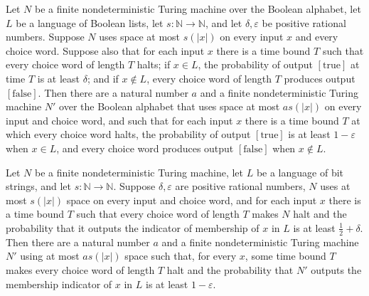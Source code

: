 \begin{theorem}
\label{Randomized.exists_rDecides_of_pos}
\leanok
{}
Let $N$ be a finite nondeterministic Turing machine over the Boolean alphabet, let $L$
be a language of Boolean lists, let $s : \mathbb{N} \to \mathbb{N}$, and let
$\delta,\varepsilon$ be positive rational numbers. Suppose $N$ uses space at most
$s(|x|)$ on every input $x$ and every choice word. Suppose also that for each input $x$
there is a time bound $T$ such that every choice word of length $T$ halts; if $x \in L$,
the probability of output $[\mathrm{true}]$ at time $T$ is at least $\delta$; and if $x
\notin L$, every choice word of length $T$ produces output $[\mathrm{false}]$. Then
there are a natural number $a$ and a finite nondeterministic Turing machine $N'$ over
the Boolean alphabet that uses space at most $a s(|x|)$ on every input and choice word,
and such that for each input $x$ there is a time bound $T$ at which every choice word
halts, the probability of output $[\mathrm{true}]$ is at least $1-\varepsilon$ when $x
\in L$, and every choice word produces output $[\mathrm{false}]$ when $x \notin L$.
\end{theorem}

\begin{theorem}
\label{Randomized.exists_bpDecides_of_advantage}
\leanok
{}
Let $N$ be a finite nondeterministic Turing machine, let $L$ be a language of bit
strings, and let $s:\mathbb{N}\to\mathbb{N}$. Suppose $\delta,\varepsilon$ are positive
rational numbers, $N$ uses at most $s(|x|)$ space on every input and choice word, and
for each input $x$ there is a time bound $T$ such that every choice word of length $T$
makes $N$ halt and the probability that it outputs the indicator of membership of $x$ in
$L$ is at least $\frac12+\delta$. Then there are a natural number $a$ and a finite
nondeterministic Turing machine $N'$ using at most $a s(|x|)$ space such that, for every
$x$, some time bound $T$ makes every choice word of length $T$ halt and the probability
that $N'$ outputs the membership indicator of $x$ in $L$ is at least $1-\varepsilon$.
\end{theorem}

